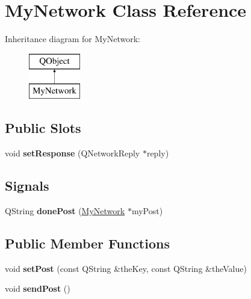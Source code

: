 \hypertarget{class_my_network}{\section{My\-Network Class Reference}
\label{class_my_network}
}
Inheritance diagram for My\-Network\-:\begin{figure}[H]
\begin{center}
\leavevmode
\includegraphics[height=2.000000cm]{class_my_network}
\end{center}
\end{figure}
\subsection*{Public Slots}
\begin{DoxyCompactItemize}
\item 
\hypertarget{class_my_network_af59760d3b07e8fb4d04ee12b0f10c62d}{void {\bfseries set\-Response} (Q\-Network\-Reply $\ast$reply)}\label{class_my_network_af59760d3b07e8fb4d04ee12b0f10c62d}

\end{DoxyCompactItemize}
\subsection*{Signals}
\begin{DoxyCompactItemize}
\item 
\hypertarget{class_my_network_a1e8cdf0cd32c60a2c573aa0016fd8783}{Q\-String {\bfseries done\-Post} (\hyperlink{class_my_network}{My\-Network} $\ast$my\-Post)}\label{class_my_network_a1e8cdf0cd32c60a2c573aa0016fd8783}

\end{DoxyCompactItemize}
\subsection*{Public Member Functions}
\begin{DoxyCompactItemize}
\item 
\hypertarget{class_my_network_a2d3f8f7fdd0121033cf6161d1e87981e}{void {\bfseries set\-Post} (const Q\-String \&the\-Key, const Q\-String \&the\-Value)}\label{class_my_network_a2d3f8f7fdd0121033cf6161d1e87981e}

\item 
\hypertarget{class_my_network_a8f2316099203c6ae2cb92075b6e6a671}{void {\bfseries send\-Post} ()}\label{class_my_network_a8f2316099203c6ae2cb92075b6e6a671}

\end{DoxyCompactItemize}
